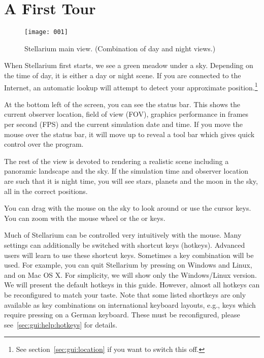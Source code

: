 

\chapter{A First Tour}
\label{ch:tour}


\begin{figure}[tbh]\centering
\texttt{[image: 001]}
\caption{Stellarium main view. (Combination of day and night views.)}
\label{fig:001}
\end{figure}

\noindent When Stellarium first starts, we see a green meadow under a
sky. Depending on the time of day, it is either a day or night
scene. If you are connected to the Internet, an automatic lookup will
attempt to detect your approximate position.\footnote{See
  section~\ref{sec:gui:location} if you want to switch this off.}

At the bottom left of the screen, you can see the status bar. This shows
the current observer location, field of view (FOV), graphics performance
in frames per second (FPS) and the current simulation date and time.
If you move the mouse over the status bar, it will move up to reveal a
tool bar which gives quick control over the program.

The rest of the view is devoted to rendering a realistic scene including
a panoramic landscape and the sky. If the simulation time and observer
location are such that it is night time, you will see stars, planets and
the moon in the sky, all in the correct positions.

You can drag with the mouse on the sky to look around or use the
cursor keys. You can zoom with the mouse wheel or the  or  keys.

Much of Stellarium can be controlled very intuitively with the
mouse. Many settings can additionally be switched with shortcut keys
(hotkeys).  Advanced users will learn to use these shortcut
keys. Sometimes a key combination will be used. For example, you can
quit Stellarium by pressing  on Windows and Linux, and
 on Mac OS X.  For simplicity, we will show only the
Windows/Linux version. We will present the default hotkeys in this
guide. However, almost all hotkeys can be reconfigured to match your
taste. Note that some listed shortkeys are only available as key
combinations on international keyboard layouts, e.g., keys which
require pressing  on a German keyboard. These must be
reconfigured, please see~\ref{sec:gui:help:hotkeys} for details.


